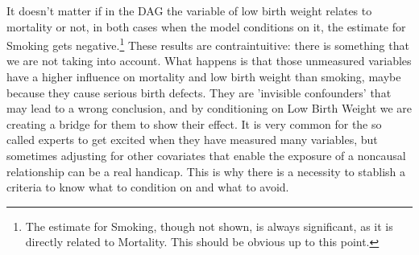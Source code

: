 \documentclass{article}
\begin{document}
It doesn't matter if in the DAG the variable of low birth weight relates to mortality or not, in both cases when the model conditions on it, the estimate for Smoking gets negative.\footnote{The estimate for Smoking, though not shown, is always significant, as it is directly related to Mortality. This should be obvious up to this point.} These results are contraintuitive: there is something that we are not taking into account.
What happens is that those unmeasured variables have a higher influence on mortality and low birth weight than smoking, maybe because they cause serious birth defects. They are 'invisible confounders' that may lead to a wrong conclusion, and by conditioning on Low Birth Weight we are creating a bridge for them to show their effect.
It is very common for the so called experts to get excited when they have measured many variables, but sometimes adjusting for other covariates that enable the exposure of a non\-causal relationship can be a real handicap. This is why there is a necessity to stablish a criteria to know what to condition on and what to avoid.
\end{document}
